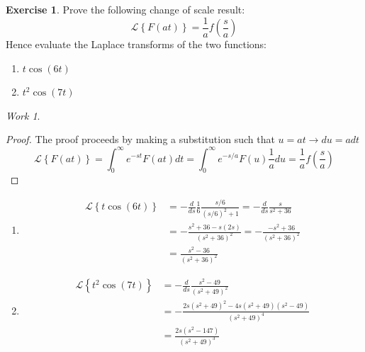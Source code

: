 \documentclass{report}
\theoremstyle{definition}
\newtheorem{exercise}{Exercise}[chapter]
\theoremstyle{remark}
\newtheorem*{work}{Work}
\newcommand{\lapt}[1]{\mathscr{L}\left\{ #1\right\}}
\newcommand{\od}[2]{\frac{d #1}{d#2}}
\begin{document}
\begin{exercise}
    Prove the following change of scale result:
    \begin{equation*}
        \lapt{F(at)}=\frac{1}{a}f\left( \frac{s}{a}\right)
    \end{equation*}
    Hence evaluate the Laplace transforms of the two functions:
    \begin{enumerate}[label=(\alph*)]
        \item $t\cos(6t)$
        \item $t^2\cos(7t)$
    \end{enumerate}
\end{exercise}
\begin{work}
\leavevmode
    \begin{proof}
        The proof proceeds by making a substitution such that $u=at \rightarrow du = adt$
        \begin{equation*}
            \lapt{F(at)} = \int^\infty_0e^{-st}F(at)dt = \int^\infty_0e^{-s/a}F(u)\frac{1}{a}du = \frac{1}{a}f\left( \frac{s}{a} \right)
        \end{equation*}
    \end{proof}
    \begin{enumerate}[label=(\alph*)]
        \item 
        \begin{equation*}
            \begin{split}
                \lapt{t\cos(6t)} &= -\od{}{s}\frac{1}{6}\frac{s/6}{(s/6)^2+1} = -\od{}{s}\frac{s}{s^2+36} \\
                &=- \frac{s^2+36-s(2s)}{(s^2+36)^2} = - \frac{-s^2+36}{(s^2+36)^2} \\
                &= \frac{s^2-36}{(s^2+36)^2}
            \end{split}
        \end{equation*}
        \item 
        \begin{equation*}
            \begin{split}
                \lapt{t^2\cos(7t)} &= -\od{}{s} \frac{s^2-49}{(s^2+49)^2}\\ &= -\frac{2s(s^2+49)^2-4s(s^2+49)(s^2-49)}{(s^2+49)^4} \\&=\frac{2s(s^2-147)}{(s^2+49)^3}
            \end{split}
        \end{equation*}
    \end{enumerate}
\end{work}
\end{document}
